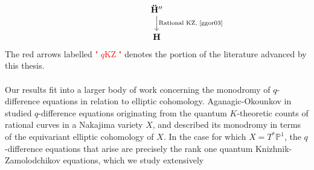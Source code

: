 \documentclass[a4paper]{report}
\theoremstyle{theorem}
\theoremstyle{definition}
\theoremstyle{remark}
\theoremstyle{proposition}
\theoremstyle{conjecture}
\theoremstyle{lemma}
\theoremstyle{corollary}
\theoremstyle{exercise}
\theoremstyle{example}
\newcommand{\on}{\operatorname}
\newcommand{\qKZ}{\on{\mathit{q}KZ}}
\begin{document}
$$\begin{tikzcd}
                                                                                                                                                                                                                                       &  &                                                                       &                                                                                        &                                        &  &                                                                                                                                             \\
                                                                                                                                                                                                                                       &  &                                                                       & \mathbf{\mathbf{\ddot{\mathbf{H}}}}'' \arrow[d, "{\text{Rational KZ, \cite{ggor03}}}"] &                                        &  &                                                                                                                                             \\
                                                                                                                                                                                                                                       &  &                                                                       & \mathbf{H}                                                                             &                                        &  &                                                                                                                                            
  \end{tikzcd}$$
  The red arrows labelled \textcolor{red}{"$\qKZ$"} denotes the portion of the literature advanced by this thesis.\\\\
  Our results fit into a larger body of work concerning the monodromy of $q$-difference equations in relation to 
  elliptic cohomology.
  Aganagic-Okounkov in \cite{ao16} studied $q$-difference equations originating from the quantum $K$-theoretic counts 
  of rational curves in a Nakajima variety $X$, and described its monodromy in terms of the equivariant elliptic 
  cohomology of $X$. In the case for which $X = T^\ast\mathbb{P}^1$, the $q$-difference equations that 
  arise are precisely the rank one quantum Knizhnik-Zamolodchikov equations, which we study extensively 
\end{document}
